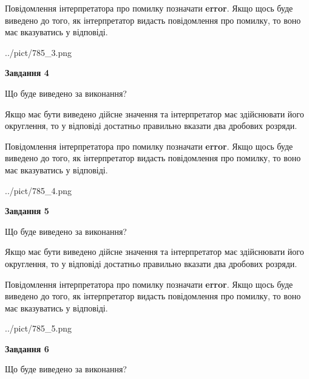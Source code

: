 \documentclass[12pt, ukrainian]{article}
\begin{document}
{\begin {Large}
Повідомлення інтерпретатора про помилку позначати \textbf{error}.
Якщо щось буде виведено до того, як інтерпретатор видасть повідомлення про помилку, 
то воно має вказуватись у відповіді. \par

\begin{center}
	{../pict/785_3.png}
\end{center}
\newpage

{\begin {center}\textbf{Завдання 4}\end {center}}\par
Що буде виведено за виконання? \par

Якщо має бути виведено дійсне значення та інтерпретатор має здійснювати його округлення, 
то у відповіді достатньо правильно вказати два дробових розряди.

Повідомлення інтерпретатора про помилку позначати \textbf{error}.
Якщо щось буде виведено до того, як інтерпретатор видасть повідомлення про помилку, 
то воно має вказуватись у відповіді. \par

\begin{center}
	{../pict/785_4.png}
\end{center}
\newpage

{\begin {center}\textbf{Завдання 5}\end {center}}\par
Що буде виведено за виконання? \par

Якщо має бути виведено дійсне значення та інтерпретатор має здійснювати його округлення, 
то у відповіді достатньо правильно вказати два дробових розряди.

Повідомлення інтерпретатора про помилку позначати \textbf{error}.
Якщо щось буде виведено до того, як інтерпретатор видасть повідомлення про помилку, 
то воно має вказуватись у відповіді. \par

\begin{center}
	{../pict/785_5.png}
\end{center}
\newpage

{\begin {center}\textbf{Завдання 6}\end {center}}\par
Що буде виведено за виконання? \par


\end{Large}}
\end{document}
